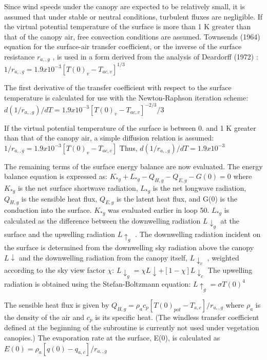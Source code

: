 Since wind speeds under the canopy are expected to be relatively small, it is assumed that under stable or neutral conditions, turbulent fluxes are negligible. If the virtual potential temperature of the surface is more than 1 K greater than that of the canopy air, free convection conditions are assumed. Townsend\textquotesingle{}s (1964) equation for the surface-\/air transfer coefficient, or the inverse of the surface resistance $r_{a,,g}$ , is used in a form derived from the analysis of Deardorff (1972) \cite{Deardorff1972-ay} \+: $1/r_{a,,g} = 1.9 x 10^{-3} [T(0)_v - T_{ac,v} ]^{1/3}$

The first derivative of the transfer coefficient with respect to the surface temperature is calculated for use with the Newton-\/\+Raphson iteration scheme\+: $d(1/r_{a,,g} )/dT = 1.9 x 10^{-3} [T(0)_v - T_{ac,v} ]^{-2/3} /3$

If the virtual potential temperature of the surface is between 0. and 1 K greater than that of the canopy air, a simple diffusion relation is assumed\+: $1/r_{a,,g} = 1.9 x 10^{-3} [T(0)_v - T_{ac,v} ]$ Thus, $d(1/r_{a,,g} )/dT = 1.9 x 10^{-3}$

The remaining terms of the surface energy balance are now evaluated. The energy balance equation is expressed as\+: $K_{*g} + L_{*g} - Q_{H,g} - Q_{E,g} - G(0) = 0$ where $K_{*g}$ is the net surface shortwave radiation, $L_{*g}$ is the net longwave radiation, $Q_{H,g}$ is the sensible heat flux, $Q_{E,g}$ is the latent heat flux, and G(0) is the conduction into the surface. $K_{*g}$ was evaluated earlier in loop 50. $L_{*g}$ is calculated as the difference between the downwelling radiation $L \downarrow_g$ at the surface and the upwelling radiation $L \uparrow_g$ . The downwelling radiation incident on the surface is determined from the downwelling sky radiation above the canopy $L \downarrow$ and the downwelling radiation from the canopy itself, $L \downarrow_c$ , weighted according to the sky view factor $\chi$\+: $L \downarrow_g = \chi L \downarrow + [1 - \chi] L \downarrow_c$ The upwelling radiation is obtained using the Stefan-\/\+Boltzmann equation\+: $L \uparrow_g = \sigma T(0)^4$

The sensible heat flux is given by $Q_{H,g} = \rho_a c_p [T(0)_{pot} - T_{a,c} ]/r_{a,,g}$ where $\rho_a$ is the density of the air and $c_p$ is its specific heat. (The windless transfer coefficient defined at the beginning of the subroutine is currently not used under vegetation canopies.) The evaporation rate at the surface, E(0), is calculated as $E(0) = \rho_a [q(0) - q_{a,c} ]/r_{a,,g}$

